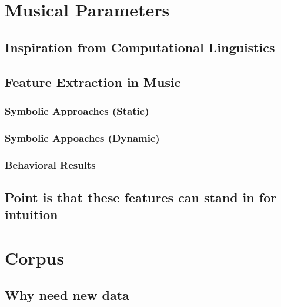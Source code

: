 \documentclass[]{book}
\theoremstyle{definition}
\theoremstyle{definition}
\theoremstyle{definition}
\theoremstyle{remark}
\begin{document}
\hypertarget{musical-parameters}{%
\chapter{Musical Parameters}\label{musical-parameters}}

\hypertarget{inspiration-from-computational-linguistics}{%
\section{Inspiration from Computational
Linguistics}\label{inspiration-from-computational-linguistics}}

\hypertarget{feature-extraction-in-music}{%
\section{Feature Extraction in
Music}\label{feature-extraction-in-music}}

\hypertarget{symbolic-approaches-static}{%
\subsection{Symbolic Approaches
(Static)}\label{symbolic-approaches-static}}

\hypertarget{symbolic-appoaches-dynamic}{%
\subsection{Symbolic Appoaches
(Dynamic)}\label{symbolic-appoaches-dynamic}}

\hypertarget{behavioral-results}{%
\subsection{Behavioral Results}\label{behavioral-results}}

\hypertarget{point-is-that-these-features-can-stand-in-for-intuition}{%
\section{Point is that these features can stand in for
intuition}\label{point-is-that-these-features-can-stand-in-for-intuition}}

\hypertarget{corpus}{%
\chapter{Corpus}\label{corpus}}

\hypertarget{why-need-new-data}{%
\section{Why need new data}\label{why-need-new-data}}
\end{document}
